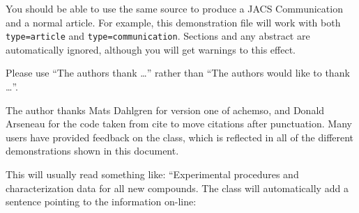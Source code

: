 \documentclass[journal=jacsat,manuscript=article]{achemso}
\begin{document}
You should be able to use the same source to produce a JACS
Communication and a normal article.  For example, this demonstration
file will work with both \texttt{type=article} and
\texttt{type=communication}. Sections and any abstract are
automatically ignored, although you will get warnings to this effect.

\begin{acknowledgement}

Please use ``The authors thank \ldots'' rather than ``The
authors would like to thank \ldots''.

The author thanks Mats Dahlgren for version one of \textsf{achemso},
and Donald Arseneau for the code taken from \textsf{cite} to move
citations after punctuation. Many users have provided feedback on the
class, which is reflected in all of the different demonstrations
shown in this document.

\end{acknowledgement}

\begin{suppinfo}

This will usually read something like: ``Experimental procedures and
characterization data for all new compounds. The class will
automatically add a sentence pointing to the information on-line:

\end{suppinfo}


\end{document}
